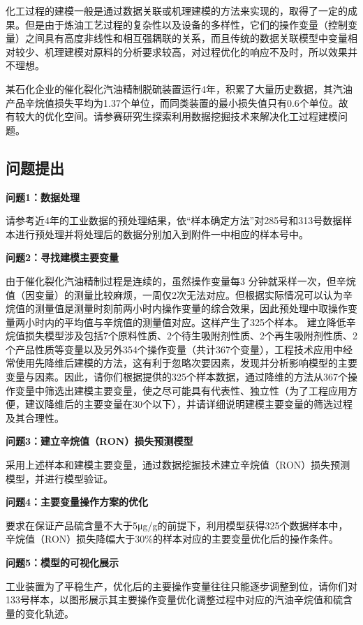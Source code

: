 \documentclass[bwprint]{gmcmthesis}
\begin{document}
化工过程的建模一般是通过数据关联或机理建模的方法来实现的，取得了一定的成果。但是由于炼油工艺过程的复杂性以及设备的多样性，它们的操作变量（控制变量）之间具有高度非线性和相互强耦联的关系，而且传统的数据关联模型中变量相对较少、机理建模对原料的分析要求较高，对过程优化的响应不及时，所以效果并不理想。

某石化企业的催化裂化汽油精制脱硫装置运行4年，积累了大量历史数据，其汽油产品辛烷值损失平均为1.37个单位，而同类装置的最小损失值只有0.6个单位。故有较大的优化空间。请参赛研究生探索利用数据挖掘技术来解决化工过程建模问题。




\FloatBarrier
\subsection{问题提出}

\textbf{问题1：数据处理}

请参考近4年的工业数据的预处理结果，依“样本确定方法”对285号和313号数据样本进行预处理并将处理后的数据分别加入到附件一中相应的样本号中。


\textbf{问题2：寻找建模主要变量}

由于催化裂化汽油精制过程是连续的，虽然操作变量每3 分钟就采样一次，但辛烷值（因变量）的测量比较麻烦，一周仅2次无法对应。但根据实际情况可以认为辛烷值的测量值是测量时刻前两小时内操作变量的综合效果，因此预处理中取操作变量两小时内的平均值与辛烷值的测量值对应。这样产生了325个样本。
建立降低辛烷值损失模型涉及包括7个原料性质、2个待生吸附剂性质、2个再生吸附剂性质、2个产品性质等变量以及另外354个操作变量（共计367个变量），工程技术应用中经常使用先降维后建模的方法，这有利于忽略次要因素，发现并分析影响模型的主要变量与因素。因此，请你们根据提供的325个样本数据，通过降维的方法从367个操作变量中筛选出建模主要变量，使之尽可能具有代表性、独立性（为了工程应用方便，建议降维后的主要变量在30个以下），并请详细说明建模主要变量的筛选过程及其合理性。

\textbf{问题3：建立辛烷值（RON）损失预测模型}

采用上述样本和建模主要变量，通过数据挖掘技术建立辛烷值（RON）损失预测模型，并进行模型验证。

\textbf{问题4：主要变量操作方案的优化}

要求在保证产品硫含量不大于5μg/g的前提下，利用模型获得325个数据样本中，辛烷值（RON）损失降幅大于30\%的样本对应的主要变量优化后的操作条件。

\textbf{问题5：模型的可视化展示}

工业装置为了平稳生产，优化后的主要操作变量往往只能逐步调整到位，请你们对133号样本，以图形展示其主要操作变量优化调整过程中对应的汽油辛烷值和硫含量的变化轨迹。
\end{document}

